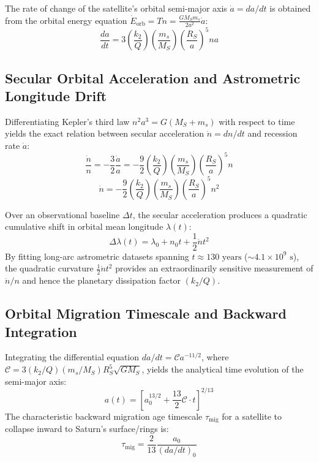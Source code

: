 \documentclass[11pt,a4paper]{article}
\begin{document}
The rate of change of the satellite's orbital semi-major axis $\dot{a} = da/dt$ is obtained from the orbital energy equation $\dot{E}_{\text{orb}} = T n = \frac{G M_S m_s}{2 a^2} \dot{a}$:
\begin{equation}
\frac{da}{dt} = 3 \left(\frac{k_2}{Q}\right) \left(\frac{m_s}{M_S}\right) \left(\frac{R_S}{a}\right)^5 n a
\end{equation}

\subsection{Secular Orbital Acceleration and Astrometric Longitude Drift}
Differentiating Kepler's third law $n^2 a^3 = G(M_S + m_s)$ with respect to time yields the exact relation between secular acceleration $\dot{n} = dn/dt$ and recession rate $\dot{a}$:
\begin{equation}
\frac{\dot{n}}{n} = -\frac{3}{2} \frac{\dot{a}}{a} = -\frac{9}{2} \left(\frac{k_2}{Q}\right) \left(\frac{m_s}{M_S}\right) \left(\frac{R_S}{a}\right)^5 n
\end{equation}
\begin{equation}
\dot{n} = -\frac{9}{2} \left(\frac{k_2}{Q}\right) \left(\frac{m_s}{M_S}\right) \left(\frac{R_S}{a}\right)^5 n^2
\end{equation}

Over an observational baseline $\Delta t$, the secular acceleration produces a quadratic cumulative shift in orbital mean longitude $\lambda(t)$:
\begin{equation}
\Delta \lambda(t) = \lambda_0 + n_0 t + \frac{1}{2} \dot{n} t^2
\end{equation}
By fitting long-arc astrometric datasets spanning $t \approx 130\text{ years}$ ($\sim 4.1 \times 10^9\text{ s}$), the quadratic curvature $\frac{1}{2}\dot{n}t^2$ provides an extraordinarily sensitive measurement of $\dot{n}/n$ and hence the planetary dissipation factor $(k_2 / Q)$.

\subsection{Orbital Migration Timescale and Backward Integration}
Integrating the differential equation $da/dt = \mathcal{C} a^{-11/2}$, where $\mathcal{C} = 3 (k_2/Q) (m_s/M_S) R_S^5 \sqrt{G M_S}$, yields the analytical time evolution of the semi-major axis:
\begin{equation}
a(t) = \left[ a_0^{13/2} + \frac{13}{2} \mathcal{C} \cdot t \right]^{2/13}
\end{equation}
The characteristic backward migration age timescale $\tau_{\text{mig}}$ for a satellite to collapse inward to Saturn's surface/rings is:
\begin{equation}
\tau_{\text{mig}} = \frac{2}{13} \frac{a_0}{(da/dt)_0}
\end{equation}
\end{document}
